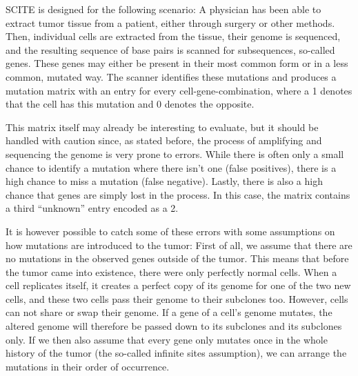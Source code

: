 \ac{SCITE} is designed for the following scenario: A physician has been able to extract tumor tissue from a patient, either through surgery or other methods. Then, individual cells are extracted from the tissue, their genome is sequenced, and the resulting sequence of base pairs is scanned for subsequences, so-called genes. These genes may either be present in their most common form or in a less common, mutated way. The scanner identifies these mutations and produces a mutation matrix with an entry for every cell-gene-combination, where a 1 denotes that the cell has this mutation and 0 denotes the opposite.

This matrix itself may already be interesting to evaluate, but it should be handled with caution since, as stated before, the process of amplifying and sequencing the genome is very prone to errors. While there is often only a small chance to identify a mutation where there isn't one (false positives), there is a high chance to miss a mutation (false negative). Lastly, there is also a high chance that genes are simply lost in the process. In this case, the matrix contains a third ``unknown'' entry encoded as a 2.


It is however possible to catch some of these errors with some assumptions on how mutations are introduced to the tumor: First of all, we assume that there are no mutations in the observed genes outside of the tumor. This means that before the tumor came into existence, there were only perfectly normal cells. When a cell replicates itself, it creates a perfect copy of its genome for one of the two new cells, and these two cells pass their genome to their subclones too. However, cells can not share or swap their genome. If a gene of a cell's genome mutates, the altered genome will therefore be passed down to its subclones and its subclones only. If we then also assume that every gene only mutates once in the whole history of the tumor (the so-called infinite sites assumption), we can arrange the mutations in their order of occurrence.

